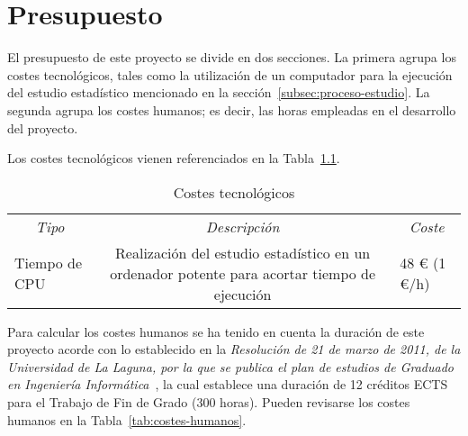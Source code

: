 \chapter{Presupuesto}
\label{cap:presupuesto}

El presupuesto de este proyecto se divide en dos secciones. La primera agrupa los costes tecnológicos, tales como la utilización de un computador para la ejecución del estudio estadístico mencionado en la sección~\ref{subsec:proceso-estudio}. La segunda agrupa los costes humanos; es decir, las horas empleadas en el desarrollo del proyecto.

Los costes tecnológicos vienen referenciados en la Tabla~\ref{tab:costes-tecnologicos}.

\begin{table}[ht]
\centering
\caption{Costes tecnológicos}
\label{tab:costes-tecnologicos}
\begin{tabular}{ccc}
\hline
\multirow{2}{*}{\textit{Tipo}}        & \multirow{2}{*}{\textit{Descripción}}                   & \multirow{2}{*}{\textit{Coste}}  \\
                                      &                                                         &                                  \\ \hline
\multicolumn{1}{l}{Tiempo de CPU} & \multicolumn{1}{p{0.5\textwidth}}{Realización del estudio estadístico en un ordenador potente para acortar tiempo de ejecución} & \multicolumn{1}{l}{48 € (1 €/h)} \\ \hline
\end{tabular}
\end{table}

Para calcular los costes humanos se ha tenido en cuenta la duración de este proyecto acorde con lo establecido en la \textit{Resolución de 21 de marzo de 2011, de la Universidad de La Laguna, por la que se  publica el plan de estudios de Graduado en Ingeniería Informática}~\cite{resolucion_2011}, la cual establece una duración de 12 créditos ECTS para el Trabajo de Fin de Grado (300 horas). Pueden revisarse los costes humanos en la Tabla~\ref{tab:costes-humanos}.

\begin{table}[ht]
\centering
\caption{Costes humanos}
\label{tab:costes-humanos}
\end{table}

